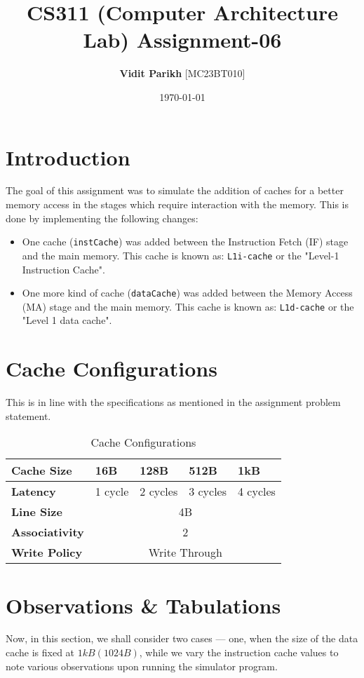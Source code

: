 \documentclass{article}
\title{\textbf{CS311} (Computer Architecture Lab) \textbf{Assignment-06}}
\author{\textbf{Vidit Parikh} [MC23BT010]}
\date{\today}
\begin{document}
\maketitle

\section{Introduction}
The goal of this assignment was to simulate the addition of caches for a better memory access in the stages which require interaction with the memory. This is done by implementing the following changes:
\begin{itemize}
    \item One cache (\texttt{instCache}) was added between the Instruction Fetch (IF) stage and the main memory. This cache is known as: \texttt{L1i-cache} or the "Level-1 Instruction Cache".
    \item One more kind of cache (\texttt{dataCache}) was added between the Memory Access (MA) stage and the main memory. This cache is known as: \texttt{L1d-cache} or the "Level 1 data cache".
\end{itemize}

\section{Cache Configurations}
{\tiny This is in line with the specifications as mentioned in the assignment problem statement.}
\begin{table}[h!]
    \centering
    \begin{tabular}{|l|l|l|l|l|}
        \hline
        \textbf{Cache Size} & \textbf{16B} & \textbf{128B} & \textbf{512B} & \textbf{1kB}\\
        \hline
        \textbf{Latency} & 1 cycle & 2 cycles & 3 cycles & 4 cycles\\
        \hline
        \textbf{Line Size} & \multicolumn{4}{c|}{4B}\\
        \hline
        \textbf{Associativity} & \multicolumn{4}{c|}{2}\\
        \hline
        \textbf{Write Policy} & \multicolumn{4}{c|}{Write Through}\\
        \hline
    \end{tabular}
    \caption{Cache Configurations}
    \label{tab:cache_config}
\end{table}

\section{Observations \& Tabulations}
Now, in this section, we shall consider two cases --- one, when the size of the data cache is fixed at $1kB (1024B)$, while we vary the instruction cache values to note various observations upon running the simulator program.
\end{document}
